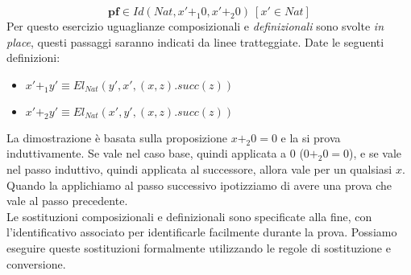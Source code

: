 \begin{displaymath}
    \textbf{pf} \in Id(Nat, x' +_1 0, x' +_2 0)\ [x' \in Nat]
\end{displaymath}
Per questo esercizio uguaglianze composizionali e \textit{definizionali} sono svolte \textit{in place}, questi passaggi saranno indicati da linee tratteggiate.
Date le seguenti definizioni:
\begin{itemize}
    \item $x' +_1 y' \equiv El_{Nat} (y', x', (x, z).succ(z))$
    \item $x' +_2 y' \equiv El_{Nat} (x', y', (x, z).succ(z))$
\end{itemize}
La dimostrazione è basata sulla proposizione $x +_2 0 = 0$ e la si prova induttivamente.
Se vale nel caso base, quindi applicata a $0$ ($0 +_2 0 = 0$), e se vale nel passo induttivo, quindi applicata al successore, allora vale per un qualsiasi $x$.
Quando la applichiamo al passo successivo ipotizziamo di avere una prova che vale al passo precedente.\\
Le sostituzioni composizionali e definizionali sono specificate alla fine, con l'identificativo associato per identificarle facilmente durante la prova.
Possiamo eseguire queste sostituzioni formalmente utilizzando le regole di sostituzione e conversione.